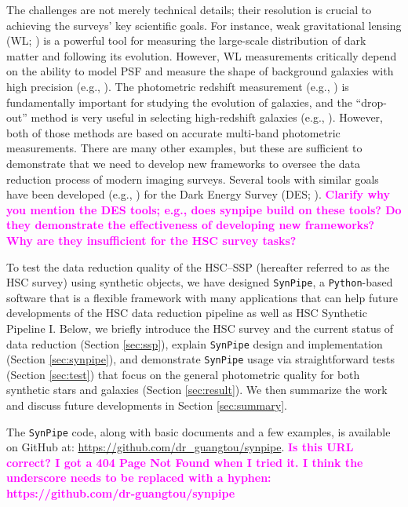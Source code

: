 \documentclass[useamsfonts]{pasj01}
\def\synpipe{\texttt{SynPipe}}
\newcommand{\susan}[1]{\textcolor{magenta} {\textbf{#1}}}
\begin{document}
    The challenges are not merely technical details; their resolution is crucial
     to achieving the surveys' key scientific goals.
    For instance, weak gravitational lensing (WL; \citealt{Kaiser1993, Bartelmann2001})
    is a powerful tool for measuring the large-scale distribution of dark matter and
    following its evolution.
    However, WL measurements critically depend on the ability to model PSF and measure the
    shape of background galaxies with high precision (e.g., \citealt{Mandelbaum2015}).
    The photometric redshift measurement (e.g., \citealt{Benitez2000, Bolzonella2000,
    Ilbert2009}) is fundamentally important for studying the evolution of galaxies,
    and the ``drop-out'' method is very useful in selecting high-redshift galaxies
    (e.g., \citealt{Steidel1996}).
    However, both of those methods are based on accurate multi-band photometric measurements.
    There are many other examples, but these are sufficient to demonstrate that we need to develop new frameworks
    to oversee the data reduction process of modern imaging surveys.
    Several tools with similar goals have been developed (e.g., \citealt{Chang2015,
    Suchyta2016}) for the Dark Energy Survey (DES; \citealt{DES2005}). \susan{Clarify why you mention the DES tools; e.g., does synpipe build on these tools? Do they demonstrate the effectiveness of developing new frameworks? Why are they insufficient for the HSC survey tasks?}

  To test the data reduction quality of the HSC--SSP (hereafter referred to
    as the HSC survey) using synthetic objects, we have designed \synpipe{}, a \texttt{Python}-based
    software that
  is a flexible framework with many applications
    that can help future developments of the HSC data reduction pipeline as well as HSC Synthetic Pipeline I.
    Below, we briefly introduce the HSC survey and the current status of
    data reduction (Section \ref{sec:ssp}),  explain  \synpipe{}  design and implementation (Section \ref{sec:synpipe}), and demonstrate \synpipe{} usage via
    straightforward tests (Section \ref{sec:test}) that focus on the general
    photometric quality for both synthetic stars and galaxies
    (Section \ref{sec:result}).
 We then summarize the work and discuss future developments in 
    Section \ref{sec:summary}.

   The  \synpipe{} code, along with basic documents and a few examples, is available
    on GitHub at: \url{https://github.com/dr_guangtou/synpipe}. \susan{Is this URL correct? I got a 404 Page Not Found when I tried it. I think the underscore needs to be replaced with a hyphen: https://github.com/dr-guangtou/synpipe}
\end{document}
